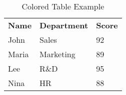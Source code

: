 \begin{table}[H]
    \centering
    \caption{Colored Table Example}
    \begin{tabular}{p{3cm}p{3cm}p{3cm}}
    \rowcolor{blue!30}
    \textbf{Name} & \textbf{Department} & \textbf{Score} \\
    John & Sales & 92 \\
    Maria & Marketing & 89 \\
    Lee & R\&D & 95 \\
    Nina & HR & 88 \\
    \end{tabular}
    \end{table}
    